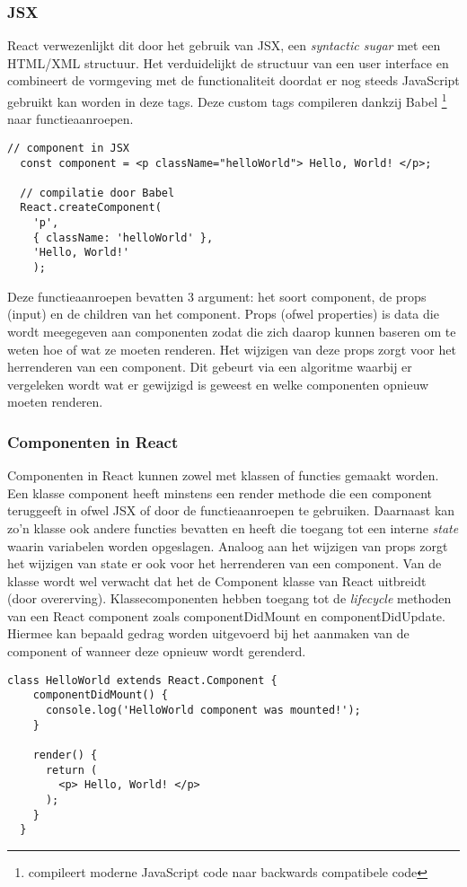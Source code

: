 \subsubsection{JSX}
React verwezenlijkt dit door het gebruik van JSX, een \textit{syntactic sugar} met een HTML/XML structuur. Het verduidelijkt de structuur van een user interface en combineert de vormgeving met de functionaliteit doordat er nog steeds JavaScript gebruikt kan worden in deze tags. Deze custom tags compileren dankzij Babel \footnote{compileert moderne JavaScript code naar backwards compatibele code} \autocite{Babel2019} naar functieaanroepen.
\begin{lstlisting}[caption=JSX compilatie]
  // component in JSX
  const component = <p className="helloWorld"> Hello, World! </p>;  

  // compilatie door Babel
  React.createComponent(
    'p',
    { className: 'helloWorld' },
    'Hello, World!'
    );
\end{lstlisting}
Deze functieaanroepen bevatten 3 argument: het soort component, de props (input) en de children van het component. Props (ofwel properties) is data die wordt meegegeven aan componenten zodat die zich daarop kunnen baseren om te weten hoe of wat ze moeten renderen. Het wijzigen van deze props zorgt voor het herrenderen van een component. Dit gebeurt via een algoritme waarbij er vergeleken wordt wat er gewijzigd is geweest en welke componenten opnieuw moeten renderen. 

\subsubsection{Componenten in React}
Componenten in React kunnen zowel met klassen of functies gemaakt worden. Een klasse component heeft minstens een render methode die een component teruggeeft in ofwel JSX of door de functieaanroepen te gebruiken.  Daarnaast kan zo'n klasse ook andere functies bevatten en heeft die toegang tot een interne \textit{state} waarin variabelen worden opgeslagen. Analoog aan het wijzigen van props zorgt het wijzigen van state er ook voor het herrenderen van een component. Van de klasse wordt wel verwacht dat het de Component klasse van React uitbreidt (door overerving). Klassecomponenten hebben toegang tot de \textit{lifecycle} methoden van een React component zoals componentDidMount en componentDidUpdate. Hiermee kan bepaald gedrag worden uitgevoerd bij het aanmaken van de component of wanneer deze opnieuw wordt gerenderd.

\begin{lstlisting}[caption=Klassecomponent]
  class HelloWorld extends React.Component {
    componentDidMount() {
      console.log('HelloWorld component was mounted!');
    }

    render() {
      return (
        <p> Hello, World! </p>
      );
    }
  }
\end{lstlisting}

